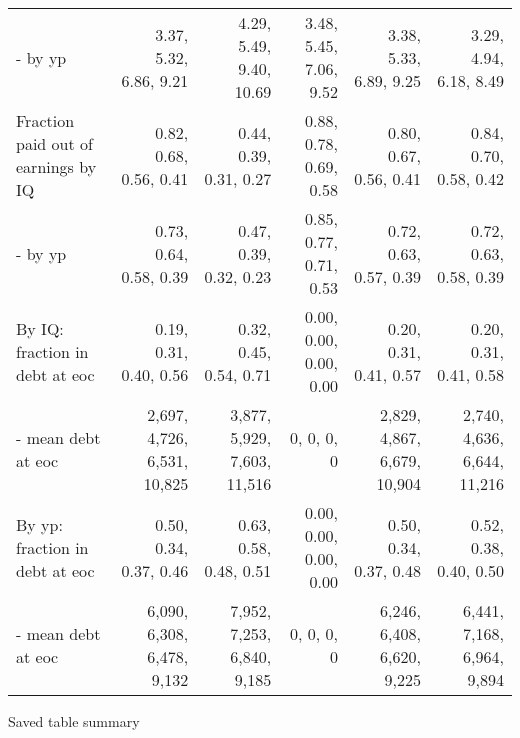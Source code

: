 \begin{tabular}{lrrrrr}
- by yp & 3.37, 5.32, 6.86, 9.21  & 4.29, 5.49, 9.40, 10.69  & 3.48, 5.45, 7.06, 9.52  & 3.38, 5.33, 6.89, 9.25  & 3.29, 4.94, 6.18, 8.49  \\ 
Fraction paid out of earnings by IQ & 0.82, 0.68, 0.56, 0.41  & 0.44, 0.39, 0.31, 0.27  & 0.88, 0.78, 0.69, 0.58  & 0.80, 0.67, 0.56, 0.41  & 0.84, 0.70, 0.58, 0.42  \\ 
- by yp & 0.73, 0.64, 0.58, 0.39  & 0.47, 0.39, 0.32, 0.23  & 0.85, 0.77, 0.71, 0.53  & 0.72, 0.63, 0.57, 0.39  & 0.72, 0.63, 0.58, 0.39  \\ 
By IQ: fraction in debt at eoc & 0.19, 0.31, 0.40, 0.56  & 0.32, 0.45, 0.54, 0.71  & 0.00, 0.00, 0.00, 0.00  & 0.20, 0.31, 0.41, 0.57  & 0.20, 0.31, 0.41, 0.58  \\ 
- mean debt at eoc & 2,697, 4,726, 6,531, 10,825  & 3,877, 5,929, 7,603, 11,516  & 0, 0, 0, 0  & 2,829, 4,867, 6,679, 10,904  & 2,740, 4,636, 6,644, 11,216  \\ 
By yp: fraction in debt at eoc & 0.50, 0.34, 0.37, 0.46  & 0.63, 0.58, 0.48, 0.51  & 0.00, 0.00, 0.00, 0.00  & 0.50, 0.34, 0.37, 0.48  & 0.52, 0.38, 0.40, 0.50  \\ 
- mean debt at eoc & 6,090, 6,308, 6,478, 9,132  & 7,952, 7,253, 6,840, 9,185  & 0, 0, 0, 0  & 6,246, 6,408, 6,620, 9,225  & 6,441, 7,168, 6,964, 9,894  \\ 
\hline
\end{tabular}%
Saved table summary

